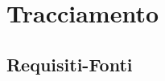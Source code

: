 %


\section{Tracciamento} %
\label{sec:tracciamento}
	\subsection{Requisiti-Fonti} %
	\label{ssub:requisiti_fonti}

